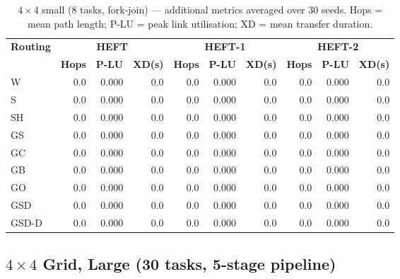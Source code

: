 \documentclass[11pt]{article}
\begin{document}
\begin{table}[H]\centering\small
\begin{tabular}{l r r r r r r r r r}
\toprule
\textbf{Routing} & \multicolumn{3}{c}{\textbf{HEFT}} & \multicolumn{3}{c}{\textbf{HEFT-1}} & \multicolumn{3}{c}{\textbf{HEFT-2}} \\
\cmidrule(lr){2-4}\cmidrule(lr){5-7}\cmidrule(lr){8-10}
& \textbf{Hops} & \textbf{P-LU} & \textbf{XD(s)} & \textbf{Hops} & \textbf{P-LU} & \textbf{XD(s)} & \textbf{Hops} & \textbf{P-LU} & \textbf{XD(s)} \\
\midrule
  W & 0.0 & 0.000 & 0.0 & 0.0 & 0.000 & 0.0 & 0.0 & 0.000 & 0.0 \\
  S & 0.0 & 0.000 & 0.0 & 0.0 & 0.000 & 0.0 & 0.0 & 0.000 & 0.0 \\
  SH & 0.0 & 0.000 & 0.0 & 0.0 & 0.000 & 0.0 & 0.0 & 0.000 & 0.0 \\
  GS & 0.0 & 0.000 & 0.0 & 0.0 & 0.000 & 0.0 & 0.0 & 0.000 & 0.0 \\
  GC & 0.0 & 0.000 & 0.0 & 0.0 & 0.000 & 0.0 & 0.0 & 0.000 & 0.0 \\
  GB & 0.0 & 0.000 & 0.0 & 0.0 & 0.000 & 0.0 & 0.0 & 0.000 & 0.0 \\
  GO & 0.0 & 0.000 & 0.0 & 0.0 & 0.000 & 0.0 & 0.0 & 0.000 & 0.0 \\
  GSD & 0.0 & 0.000 & 0.0 & 0.0 & 0.000 & 0.0 & 0.0 & 0.000 & 0.0 \\
  GSD-D & 0.0 & 0.000 & 0.0 & 0.0 & 0.000 & 0.0 & 0.0 & 0.000 & 0.0 \\
\bottomrule\end{tabular}
\caption{$4\times4$ small (8 tasks, fork-join) --- additional metrics averaged over 30 seeds. Hops = mean path length; P-LU = peak link utilisation; XD = mean transfer duration.}
\end{table}

\subsection{$4\times4$ Grid, Large (30 tasks, 5-stage pipeline)}
\end{document}
